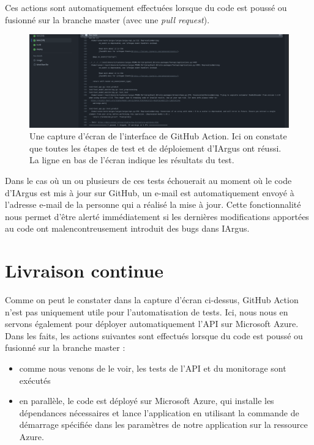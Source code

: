 \documentclass[french]{article}
\begin{document}
    Ces actions sont automatiquement effectuées lorsque du code est poussé ou fusionné sur la branche master (avec une \textit{pull request}).

    \begin{figure}[h!]
        \includegraphics[width=12cm]{gh_action}
        \centering
        \caption{Une capture d'écran de l'interface de GitHub Action. Ici on constate que toutes les étapes de test et de déploiement d'IArgus ont réussi. La ligne en bas de l'écran indique les résultats du test.}
    \end{figure}

    Dans le cas où un ou plusieurs de ces tests échouerait au moment où le code d'IArgus est mis à jour sur GitHub, un e-mail est automatiquement envoyé à l'adresse e-mail de la personne qui a réalisé la mise à jour. Cette fonctionnalité nous permet d'être alerté immédiatement si les dernières modifications apportées au code ont malencontreusement introduit des bugs dans IArgus.


    \section{Livraison continue}
    
    Comme on peut le constater dans la capture d'écran ci-dessus, GitHub Action n'est pas uniquement utile pour l'automatisation de tests. Ici, nous nous en servons également pour déployer automatiquement l'API sur Microsoft Azure. Dans les faits, les actions suivantes sont effectués lorsque du code est poussé ou fusionné sur la branche master :
    \begin{itemize}
        \item comme nous venons de le voir, les tests de l'API et du monitorage sont exécutés
        \item en parallèle, le code est déployé sur Microsoft Azure, qui installe les dépendances nécessaires et lance l'application en utilisant la commande de démarrage spécifiée dans les paramètres de notre application sur la ressource Azure.
    \end{itemize}
    
\end{document}
